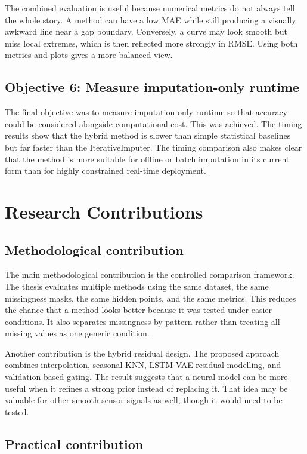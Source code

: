 The combined evaluation is useful because numerical metrics do not always tell the whole story. A method can have a low MAE while still producing a visually awkward line near a gap boundary. Conversely, a curve may look smooth but miss local extremes, which is then reflected more strongly in RMSE. Using both metrics and plots gives a more balanced view.

\subsection{Objective 6: Measure imputation-only runtime}

The final objective was to measure imputation-only runtime so that accuracy could be considered alongside computational cost. This was achieved. The timing results show that the hybrid method is slower than simple statistical baselines but far faster than the IterativeImputer. The timing comparison also makes clear that the method is more suitable for offline or batch imputation in its current form than for highly constrained real-time deployment.

\section{Research Contributions}

\subsection{Methodological contribution}

The main methodological contribution is the controlled comparison framework. The thesis evaluates multiple methods using the same dataset, the same missingness masks, the same hidden points, and the same metrics. This reduces the chance that a method looks better because it was tested under easier conditions. It also separates missingness by pattern rather than treating all missing values as one generic condition.

Another contribution is the hybrid residual design. The proposed approach combines interpolation, seasonal KNN, LSTM-VAE residual modelling, and validation-based gating. The result suggests that a neural model can be more useful when it refines a strong prior instead of replacing it. That idea may be valuable for other smooth sensor signals as well, though it would need to be tested.

\subsection{Practical contribution}

